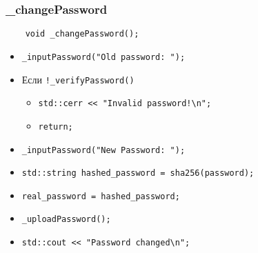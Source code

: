 \subsubsection{\_changePassword}

\begin{lstlisting}
    void _changePassword();
\end{lstlisting}

\begin{itemize}
    \item \verb|_inputPassword("Old password: ");|
    \item Если \verb|!_verifyPassword()|
    \begin{itemize}
        \item \verb|std::cerr << "Invalid password!\n";|
        \item \verb|return;|
    \end{itemize}
    \item \verb|_inputPassword("New Password: ");|
    \item \verb|std::string hashed_password = sha256(password);|
    \item \verb|real_password = hashed_password;|
    \item \verb|_uploadPassword();|
    \item \verb|std::cout << "Password changed\n";|
\end{itemize}

